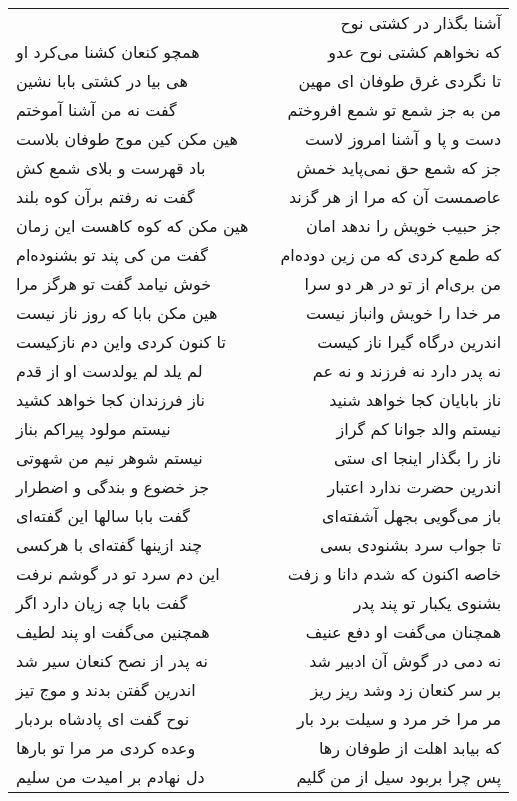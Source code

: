 \begin{center}
\begin{longtable}{l p{0.5cm} r}
&&
آشنا بگذار در کشتی نوح
\\
همچو کنعان کشنا می‌کرد او
&&
که نخواهم کشتی نوح عدو
\\
هی بیا در کشتی بابا نشین
&&
تا نگردی غرق طوفان ای مهین
\\
گفت نه من آشنا آموختم
&&
من به جز شمع تو شمع افروختم
\\
هین مکن کین موج طوفان بلاست
&&
دست و پا و آشنا امروز لاست
\\
باد قهرست و بلای شمع کش
&&
جز که شمع حق نمی‌پاید خمش
\\
گفت نه رفتم برآن کوه بلند
&&
عاصمست آن که مرا از هر گزند
\\
هین مکن که کوه کاهست این زمان
&&
جز حبیب خویش را ندهد امان
\\
گفت من کی پند تو بشنوده‌ام
&&
که طمع کردی که من زین دوده‌ام
\\
خوش نیامد گفت تو هرگز مرا
&&
من بری‌ام از تو در هر دو سرا
\\
هین مکن بابا که روز ناز نیست
&&
مر خدا را خویش وانباز نیست
\\
تا کنون کردی واین دم نازکیست
&&
اندرین درگاه گیرا ناز کیست
\\
لم یلد لم یولدست او از قدم
&&
نه پدر دارد نه فرزند و نه عم
\\
ناز فرزندان کجا خواهد کشید
&&
ناز بابایان کجا خواهد شنید
\\
نیستم مولود پیراکم بناز
&&
نیستم والد جوانا کم گراز
\\
نیستم شوهر نیم من شهوتی
&&
ناز را بگذار اینجا ای ستی
\\
جز خضوع و بندگی و اضطرار
&&
اندرین حضرت ندارد اعتبار
\\
گفت بابا سالها این گفته‌ای
&&
باز می‌گویی بجهل آشفته‌ای
\\
چند ازینها گفته‌ای با هرکسی
&&
تا جواب سرد بشنودی بسی
\\
این دم سرد تو در گوشم نرفت
&&
خاصه اکنون که شدم دانا و زفت
\\
گفت بابا چه زیان دارد اگر
&&
بشنوی یکبار تو پند پدر
\\
همچنین می‌گفت او پند لطیف
&&
همچنان می‌گفت او دفع عنیف
\\
نه پدر از نصح کنعان سیر شد
&&
نه دمی در گوش آن ادبیر شد
\\
اندرین گفتن بدند و موج تیز
&&
بر سر کنعان زد وشد ریز ریز
\\
نوح گفت ای پادشاه بردبار
&&
مر مرا خر مرد و سیلت برد بار
\\
وعده کردی مر مرا تو بارها
&&
که بیابد اهلت از طوفان رها
\\
دل نهادم بر امیدت من سلیم
&&
پس چرا بربود سیل از من گلیم

\end{longtable}
\end{center}
